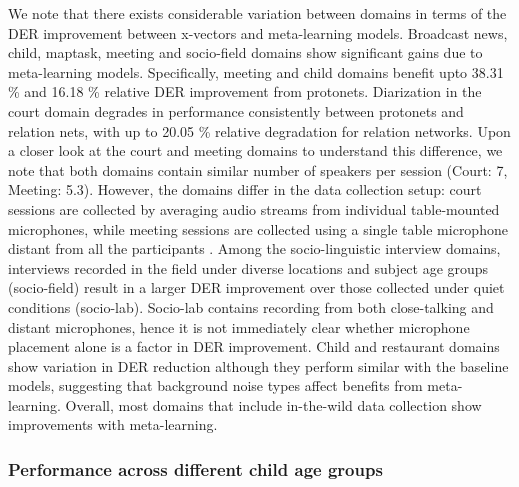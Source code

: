 We note that there exists considerable variation between domains in terms of the DER improvement between x-vectors and meta-learning models. Broadcast news, child, maptask, meeting and socio-field domains show significant gains due to meta-learning models. Specifically, meeting and child domains benefit upto 38.31 \% and 16.18 \% relative DER improvement from protonets. Diarization in the court domain degrades in performance consistently between protonets and relation nets, with up to 20.05 \% relative degradation for relation networks. Upon a closer look at the court and meeting domains to understand this difference, we note that both domains contain similar number of speakers per session (Court: 7, Meeting: 5.3). However, the domains differ in the data collection setup: court sessions are collected by averaging audio streams from individual table-mounted microphones, while meeting sessions are collected using a single table microphone distant from all the participants \cite{ryant2019second}. Among the socio-linguistic interview domains, interviews recorded in the field under diverse locations and subject age groups (socio-field) result in a larger DER improvement over those collected under quiet conditions (socio-lab). Socio-lab contains recording from both close-talking and distant microphones, hence it is not immediately clear whether microphone placement alone is a factor in DER improvement. 
Child and restaurant domains show variation in DER reduction although they perform similar with the baseline models, suggesting that background noise types affect benefits from meta-learning.
Overall, most domains that include in-the-wild data collection show improvements with meta-learning.

\subsubsection{Performance across different child age groups}

